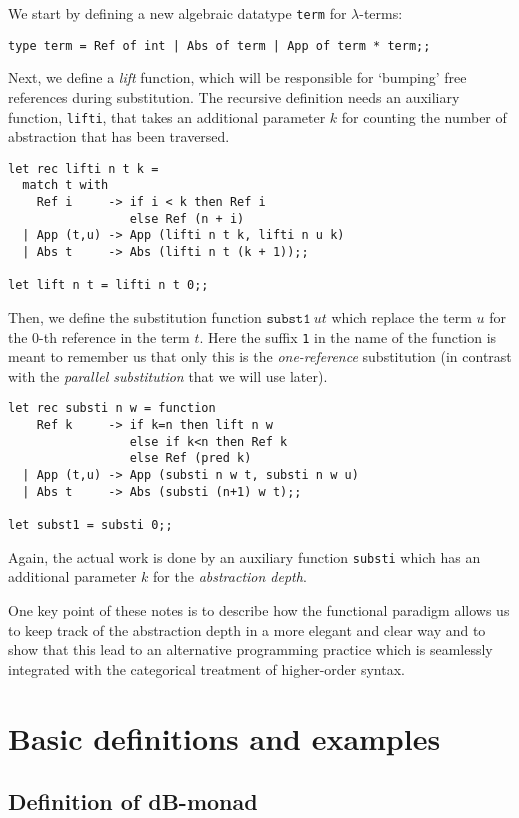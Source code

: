 \documentclass[a4paper,twoside,12pt]{article}
\theoremstyle{definition}
\theoremstyle{remark}
\theoremstyle{example}
\begin{document}
We start by defining a new algebraic datatype \texttt{term} for
$\lambda$-terms:
\begin{verbatim}
type term = Ref of int | Abs of term | App of term * term;;
\end{verbatim}
Next, we define a \emph{lift} function, which will be responsible for
`bumping' free references during substitution.  The recursive
definition needs an auxiliary function, \texttt{lifti}, that takes an
additional parameter $k$ for counting the number of abstraction that
has been traversed.
\begin{verbatim}
let rec lifti n t k =
  match t with
    Ref i     -> if i < k then Ref i
                 else Ref (n + i)
  | App (t,u) -> App (lifti n t k, lifti n u k)
  | Abs t     -> Abs (lifti n t (k + 1));;

let lift n t = lifti n t 0;;
\end{verbatim}
Then, we define the substitution function $\mathtt{subst1}\ u t$ which
replace the term $u$ for the $0$-th reference in the term $t$.  Here
the suffix \texttt{1} in the name of the function is meant to remember
us that only this is the \emph{one-reference} substitution (in
contrast with the \emph{parallel substitution} that we will use
later).
\begin{verbatim}
let rec substi n w = function
    Ref k     -> if k=n then lift n w
                 else if k<n then Ref k
                 else Ref (pred k)
  | App (t,u) -> App (substi n w t, substi n w u)
  | Abs t     -> Abs (substi (n+1) w t);;

let subst1 = substi 0;;
\end{verbatim}
Again, the actual work is done by an auxiliary function
\texttt{substi} which has an additional parameter $k$ for
the \emph{abstraction depth}.

One key point of these notes is to describe how the functional
paradigm allows us to keep track of the abstraction depth in a more
elegant and clear way and to show that this lead to an alternative
programming practice which is seamlessly integrated with the
categorical treatment of higher-order syntax.

\section{Basic definitions and examples}
\label{sec:basic-def}

\subsection{Definition of dB-monad}
\label{sec:basic-defin-example}
\end{document}
